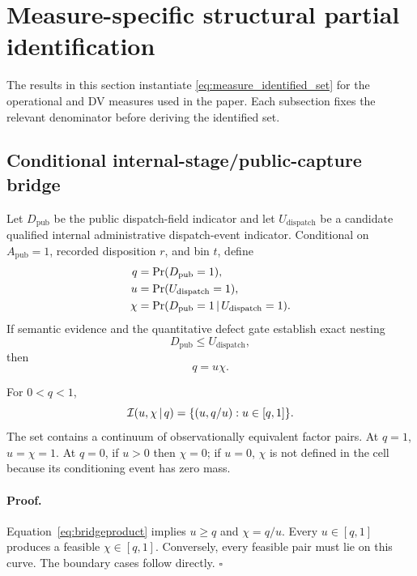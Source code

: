 \documentclass[11pt]{article}
\begin{document}
\section{Measure-specific structural partial identification}
\label{sec:structural}

The results in this section instantiate \cref{eq:measure_identified_set} for the operational and DV measures used in the paper. Each subsection fixes the relevant denominator before deriving the identified set.

\subsection{Conditional internal-stage/public-capture bridge}

Let $D_{\mathrm{pub}}$ be the public dispatch-field indicator and let $U_{\mathrm{dispatch}}$ be a candidate qualified internal administrative dispatch-event indicator. Conditional on $A_{\mathrm{pub}}=1$, recorded disposition $r$, and bin $t$, define
\begin{align}
q&=\Pr(D_{\mathrm{pub}}=1),\\
u&=\Pr(U_{\mathrm{dispatch}}=1),\\
\chi&=\Pr(D_{\mathrm{pub}}=1\,|\, U_{\mathrm{dispatch}}=1).
\end{align}
If semantic evidence and the quantitative defect gate establish exact nesting
\begin{equation}
D_{\mathrm{pub}}\le U_{\mathrm{dispatch}},
\label{eq:nesting}
\end{equation}
then
\begin{equation}
q=u\chi.
\label{eq:bridgeproduct}
\end{equation}

\begin{plainbox}[title=Theorem 2: product non-identification]
For $0<q<1$,
\begin{equation}
\mathcal{I}(u,\chi\,|\, q)=
\{(u,q/u):u\in[q,1]\}.
\label{eq:productset}
\end{equation}
The set contains a continuum of observationally equivalent factor pairs. At $q=1$, $u=\chi=1$. At $q=0$, if $u>0$ then $\chi=0$; if $u=0$, $\chi$ is not defined in the cell because its conditioning event has zero mass.
\end{plainbox}

\paragraph{Proof.}
Equation~\eqref{eq:bridgeproduct} implies $u\ge q$ and $\chi=q/u$. Every $u\in[q,1]$ produces a feasible $\chi\in[q,1]$. Conversely, every feasible pair must lie on this curve. The boundary cases follow directly. $\square$
\end{document}

